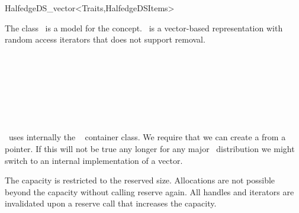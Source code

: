 
\ccRefPageBegin



\begin{ccRefClass}{HalfedgeDS_vector<Traits,HalfedgeDSItems>}

\ccDefinition
  
The class \ccRefName\ is a model for the  concept.
\ccRefName\ is a vector-based representation with random
access iterators that does not support removal.


\ccIsModel


\ccTypes
{}

\ccGlue
{}

\ccSeeAlso

\\
\\
\\
\\
\\
\\


\ccImplementation

\ccRefName\ uses internally the \stl\  container
class. We require that we can create a 
from a pointer. If this will not be true any longer for any major \stl\
distribution we might switch to an internal implementation of a vector.

The capacity is restricted to the reserved size. Allocations
are not possible beyond the capacity without calling reserve again.
All handles and iterators are invalidated upon a reserve call that
increases the capacity.

\end{ccRefClass}

\ccRefPageEnd


